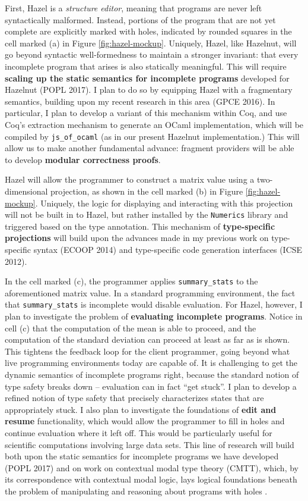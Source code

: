 \documentclass[9pt]{extarticle}
\let\li\lstinline
\begin{document}
First, Hazel is a \emph{structure editor}, meaning that programs are never left syntactically malformed. Instead, portions of the program that are not yet complete are explicitly marked with holes, indicated by rounded squares in the cell marked (a) in Figure \ref{fig:hazel-mockup}. Uniquely, Hazel, like Hazelnut, will go beyond syntactic well-formedness to maintain a stronger invariant: that every incomplete program that arises is also statically meaningful. This will require \textbf{scaling up the static semantics for incomplete programs} developed for Hazelnut (POPL 2017). I plan to do so by equipping Hazel with a fragmentary semantics, building upon my recent research in this area (GPCE 2016). In particular, I plan to develop a variant of this mechanism within Coq, and use Coq's extraction mechanism to generate an OCaml implementation, which will be compiled by \li{js_of_ocaml} (as in our present Hazelnut implementation.) This will allow us to make another fundamental advance: fragment providers will be able to develop \textbf{modular correctness proofs}.

Hazel will allow the programmer to construct a matrix value using a {two-dimensional projection}, as shown in the cell marked (b) in Figure \ref{fig:hazel-mockup}.  Uniquely, the logic for displaying and interacting with this projection will not be built in to Hazel, but rather installed by the \li{Numerics} library and triggered based on the type annotation. This mechanism of \textbf{type-specific projections} will build upon the advances made in my previous work on type-specific syntax (ECOOP 2014) and type-specific code generation interfaces (ICSE 2012).%

In the cell marked (c), the programmer applies \li{summary_stats} to the aforementioned matrix value. In a standard programming environment, the fact that \li{summary_stats} is incomplete would disable evaluation. For Hazel, however, I plan to investigate the problem of \textbf{evaluating incomplete programs}. Notice in cell (c) that the computation of the mean is able to proceed, and the computation of the standard deviation can proceed at least as far as is shown. This tightens the feedback loop for the client programmer, going beyond what live programming environments today are capable of. It is challenging to get the dynamic semantics of incomplete programs right, because the standard notion of type safety breaks down -- evaluation can in fact ``get stuck''. I plan to develop a refined notion of type safety that precisely characterizes states that are appropriately stuck. I also plan to investigate the foundations of \textbf{edit and resume} functionality, which would allow the programmer to fill in holes and continue evaluation where it left off. This would be particularly useful for scientific computations involving large data sets. This line of research will build both upon the static semantics for incomplete programs we have developed (POPL 2017) and on work on contextual modal type theory (CMTT), which, by its correspondence with contextual modal logic, lays logical foundations beneath the problem of manipulating and reasoning about programs with holes \cite{Nanevski2008}.
\end{document}
